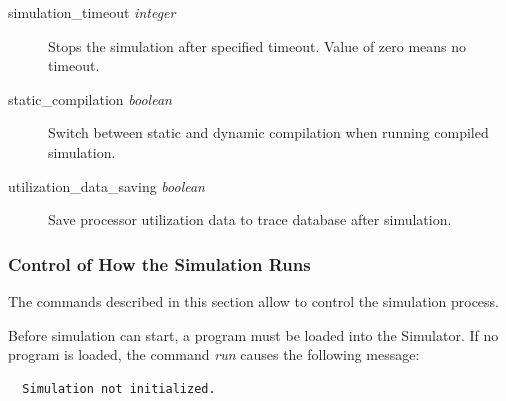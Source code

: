 \documentclass[a4paper,twoside]{tceusermanual}
\begin{document}
\begin{description}
\item[simulation\_timeout {\emph{integer}}]%
Stops the simulation after specified timeout. Value of zero means no timeout.

\item[static\_compilation {\emph{boolean}}]%
Switch between static and dynamic compilation when running compiled simulation. 


\item[utilization\_data\_saving {\emph{boolean}}]%
Save processor utilization data to trace database after simulation.

\end{description}

\subsubsection{Control of How the Simulation Runs}
\label{ssec:debug-running}

The commands described in this section allow to control the simulation process.

Before simulation can start, a program must be loaded into the Simulator.
If no program is loaded, the command \emph{run} causes the following
message:
\begin{verbatim}
  Simulation not initialized.
\end{verbatim}
\end{document}

